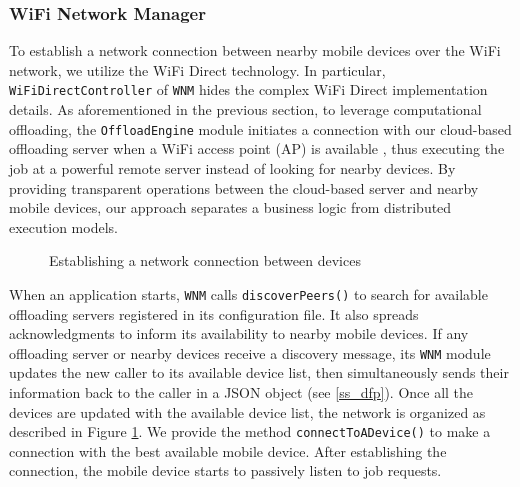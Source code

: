 \documentclass{sig-alternate}[10pt]
\begin{document}
\subsubsection{WiFi Network Manager}
To establish a network connection between nearby mobile devices over the WiFi network, we utilize the WiFi Direct technology. In particular, \texttt{WiFiDirectController} of \texttt{WNM} hides the complex WiFi Direct implementation details. As aforementioned in the previous section, to leverage computational offloading, the \texttt{OffloadEngine} module initiates a connection with our cloud-based offloading server when a WiFi access point (AP) is available \cite{kwon+:mobilesoft2015}, thus executing the job at a powerful remote server instead of looking for nearby devices. By providing transparent operations between the cloud-based server and nearby mobile devices, our approach separates a business logic from distributed execution models.

\begin{figure}
	\centering
	\caption{Establishing a network connection between devices}
	\label{fig:forming}
\end{figure}

When an application starts, \texttt{WNM} calls \texttt{discoverPeers()} to search for available offloading servers registered in its configuration file. It also spreads acknowledgments to inform its availability to nearby mobile devices. If any offloading server or nearby devices receive a discovery message, its \texttt{WNM} module updates the new caller to its available device list, then simultaneously sends their information back to the caller in a JSON object (see \ref{ss_dfp}). Once all the devices are updated with the available device list, the network is organized as described in Figure \ref{fig:forming}. We provide the method \texttt{connectToADevice()} to make a connection with the best available mobile device. After establishing the connection, the mobile device starts to passively listen to job requests.
\end{document}
